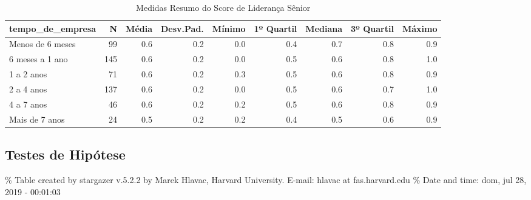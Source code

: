 \documentclass[]{book}
\begin{document}
\begin{table}[t]

\caption{\label{tab:unnamed-chunk-33}Medidas Resumo do Score de Liderança Sênior}
\centering
\fontsize{7}{9}\selectfont
\begin{tabular}{lrrrrrrrr}
\toprule
tempo\_de\_empresa & N & Média & Desv.Pad. & Mínimo & 1º Quartil & Mediana & 3º Quartil & Máximo\\
\midrule
Menos de 6 meses & 99 & 0.6 & 0.2 & 0.0 & 0.4 & 0.7 & 0.8 & 0.9\\
6 meses a 1 ano & 145 & 0.6 & 0.2 & 0.0 & 0.5 & 0.6 & 0.8 & 1.0\\
1 a 2 anos & 71 & 0.6 & 0.2 & 0.3 & 0.5 & 0.6 & 0.8 & 0.9\\
2 a 4 anos & 137 & 0.6 & 0.2 & 0.0 & 0.5 & 0.6 & 0.7 & 1.0\\
4 a 7 anos & 46 & 0.6 & 0.2 & 0.2 & 0.5 & 0.6 & 0.8 & 0.9\\
\addlinespace
Mais de 7 anos & 24 & 0.5 & 0.2 & 0.2 & 0.4 & 0.5 & 0.6 & 0.9\\
\bottomrule
\end{tabular}
\end{table}

\pagebreak

\hypertarget{testes-de-hipotese-12}{%
\subsection{Testes de Hipótese}\label{testes-de-hipotese-12}}

\% Table created by stargazer v.5.2.2 by Marek Hlavac, Harvard University. E-mail: hlavac at fas.harvard.edu
\% Date and time: dom, jul 28, 2019 - 00:01:03
\end{document}
